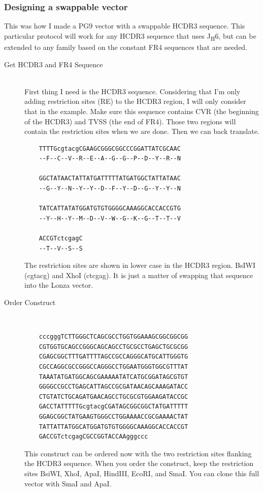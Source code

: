 \subsubsection{Designing a swappable vector}
This was how I made a PG9 vector with a swappable HCDR3 sequence. This particular protocol will work for any HCDR3 sequence that uses J\textsubscript{H}6, but can be extended to any family based on the constant FR4 sequences that are needed.
\begin{description}
  \item[Get HCDR3 and FR4 Sequence] \hfill \\
  First thing I need is the HCDR3 sequence. Considering that I'm only adding restriction sites (RE) to the HCDR3 region, I will only consider that in the example. Make sure this sequence contains CVR (the beginning of the HCDR3) and TVSS (the end of FR4). Those two regions will contain the restriction sites when we are done. Then we can back translate.
    \begin{verbatim}
    TTTTGcgtacgCGAAGCGGGCGGCCCGGATTATCGCAAC
    --F--C--V--R--E--A--G--G--P--D--Y--R--N

    GGCTATAACTATTATGATTTTTATGATGGCTATTATAAC
    --G--Y--N--Y--Y--D--F--Y--D--G--Y--Y--N

    TATCATTATATGGATGTGTGGGGCAAAGGCACCACCGTG
    --Y--H--Y--M--D--V--W--G--K--G--T--T--V

    ACCGTctcgagC
    --T--V--S--S
    \end{verbatim}
 The restriction sites are shown in lower case in the HCDR3 region. BsIWI (cgtacg) and XhoI (ctcgag). It is just a matter of swapping that sequence into the Lonza vector.
 \item[Order Construct] \hfill \\
    \begin{verbatim}
    cccgggTCTTGGGCTCAGCGCCTGGTGGAAAGCGGCGGCGG
    CGTGGTGCAGCCGGGCAGCAGCCTGCGCCTGAGCTGCGCGG
    CGAGCGGCTTTGATTTTAGCCGCCAGGGCATGCATTGGGTG
    CGCCAGGCGCCGGGCCAGGGCCTGGAATGGGTGGCGTTTAT
    TAAATATGATGGCAGCGAAAAATATCATGCGGATAGCGTGT
    GGGGCCGCCTGAGCATTAGCCGCGATAACAGCAAAGATACC
    CTGTATCTGCAGATGAACAGCCTGCGCGTGGAAGATACCGC
    GACCTATTTTTGcgtacgCGATAGCGGCGGCTATGATTTTT
    GGAGCGGCTATGAAGTGGGCCTGGAAAACCGCGAAAACTAT
    TATTATTATGGCATGGATGTGTGGGGCAAAGGCACCACCGT
    GACCGTctcgagCGCCGGTACCAAgggccc
    \end{verbatim}
 This construct can be ordered now with the two restriction sites flanking the HCDR3 sequence. When you order the construct, keep the restriction sites BsiWI, XhoI, ApaI, HindIII, EcoRI, and SmaI. You can clone this full vector with SmaI and ApaI.
\end{description}


